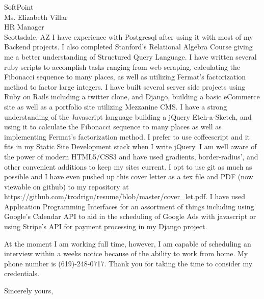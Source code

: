 \documentclass{letter} %
\begin{document}
\begin{letter}{
SoftPoint \\
Ms. Elizabeth Villar \\
HR Manager \\
Scottsdale, AZ}
\noindent I have experience with Postgresql after using it with most of my Backend projects.  I also completed Stanford's Relational Algebra Course giving me a better understanding of Structured Query Language.  I have written several ruby scripts to accomplish tasks ranging from web scraping, calculating the Fibonacci sequence to many places, as well as utilizing Fermat's factorization method to factor large integers.  I have built several server side projects using Ruby on Rails including a twitter clone, and Django, building a basic eCommerce site as well as a portfolio site utilizing Mezzanine CMS.  I have a strong understanding of the Javascript language building a jQuery Etch-a-Sketch, and using it to calculate the Fibonacci sequence to many places as well as implementing Fermat's factorization method.  I prefer to use coffeescript and it fits in my Static Site Development stack when I write jQuery.  I am well aware of the power of modern HTML5/CSS3 and have used gradients, border-radius', and other convenient additions to keep my sites current.  I opt to use git as much as possible and I have even pushed up this cover letter as a tex file and PDF (now viewable on github) to my repository at https://github.com/trodrigu/resume/blob/master/cover\_let.pdf.  I have used Application Programming Interfaces for an assortment of things including using Google's Calendar API to aid in the scheduling of Google Ads with javascript or using Stripe's API for payment processing in my Django project.
 

\noindent At the moment I am working full time, however, I am capable of scheduling an interview within a weeks notice because of the ability to work from home.  My phone number is (619)-248-0717.  Thank you for taking the time to consider my credentials.
 
\closing{Sincerely yours,} 
 

 

\end{letter}
 
\end{document}
